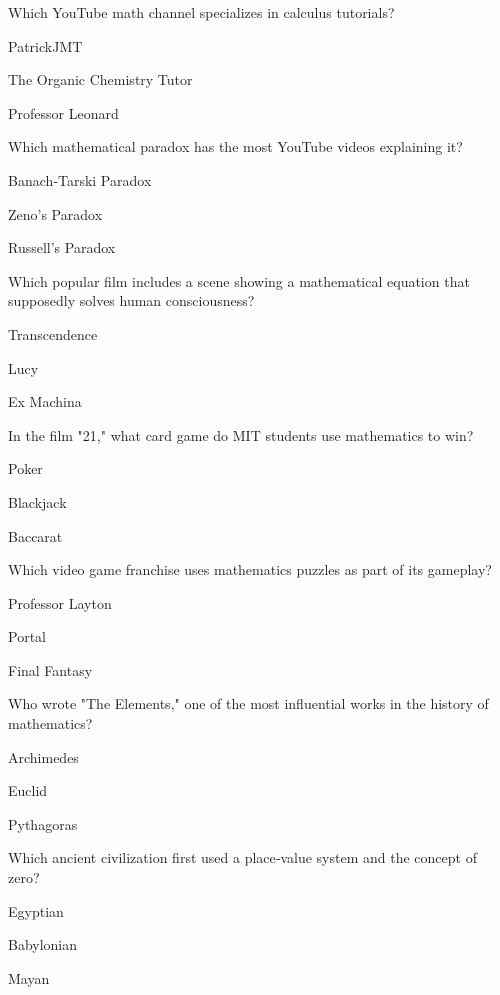 \begin{enhancedmcq}{Which YouTube math channel specializes in calculus tutorials?}
\item PatrickJMT
\item The Organic Chemistry Tutor
\item Professor Leonard

\end{enhancedmcq}
\begin{enhancedmcq}{Which mathematical paradox has the most YouTube videos explaining it?}
\item Banach‑Tarski Paradox
\item Zeno's Paradox
\item Russell's Paradox

\end{enhancedmcq}
\begin{enhancedmcq}{Which popular film includes a scene showing a mathematical equation that supposedly solves human consciousness?}
\item Transcendence
\item Lucy
\item Ex Machina

\end{enhancedmcq}
\begin{enhancedmcq}{In the film "21," what card game do MIT students use mathematics to win?}
\item Poker
\item Blackjack
\item Baccarat

\end{enhancedmcq}
\begin{enhancedmcq}{Which video game franchise uses mathematics puzzles as part of its gameplay?}
\item Professor Layton
\item Portal
\item Final Fantasy

\end{enhancedmcq}
\begin{enhancedmcq}{Who wrote "The Elements," one of the most influential works in the history of mathematics?}
\item Archimedes
\item Euclid
\item Pythagoras

\end{enhancedmcq}
\begin{enhancedmcq}{Which ancient civilization first used a place‑value system and the concept of zero?}
\item Egyptian
\item Babylonian
\item Mayan

\end{enhancedmcq}
